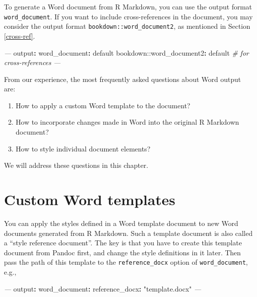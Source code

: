 \documentclass[
  11pt,
]{krantz}
\newenvironment{Shaded}{\begin{snugshade}}{\end{snugshade}}
\newcommand{\AttributeTok}[1]{\textcolor[rgb]{0.61,0.61,0.61}{#1}}
\newcommand{\CommentTok}[1]{\textcolor[rgb]{0.37,0.37,0.37}{\textit{#1}}}
\newcommand{\FunctionTok}[1]{\textcolor[rgb]{0,0,0}{#1}}
\newcommand{\KeywordTok}[1]{\textcolor[rgb]{0.27,0.27,0.27}{\textbf{#1}}}
\newcommand{\PreprocessorTok}[1]{\textcolor[rgb]{0.37,0.37,0.37}{\textit{#1}}}
\newcommand{\StringTok}[1]{\textcolor[rgb]{0.5,0.5,0.5}{#1}}
\begin{document}
To generate a Word document from R Markdown, you can use the output format \texttt{word\_document}. If you want to include cross-references in the document, you may consider the output format \texttt{bookdown::word\_document2}, as mentioned in Section \ref{cross-ref}.

\begin{Shaded}
\begin{Highlighting}[]
\PreprocessorTok{---}
\FunctionTok{output}\KeywordTok{:}
\AttributeTok{  }\FunctionTok{word_document}\KeywordTok{:}\AttributeTok{ default}
\AttributeTok{  bookdown:}\FunctionTok{:word_document2}\KeywordTok{:}\AttributeTok{ default}\CommentTok{  # for cross-references}
\PreprocessorTok{---}
\end{Highlighting}
\end{Shaded}

From our experience, the most frequently asked questions about Word output are:

\begin{enumerate}
\def\labelenumi{\arabic{enumi}.}
\item
  How to apply a custom Word template to the document?
\item
  How to incorporate changes made in Word into the original R Markdown document?
\item
  How to style individual document elements?
\end{enumerate}

We will address these questions in this chapter.

\hypertarget{word-template}{%
\section{Custom Word templates}\label{word-template}}

You can apply the styles defined in a Word template document to new Word documents generated from R Markdown. Such a template document is also called a ``style reference document''. The key is that you have to create this template document from Pandoc first, and change the style definitions in it later. Then pass the path of this template to the \texttt{reference\_docx} option of \texttt{word\_document}, e.g.,

\begin{Shaded}
\begin{Highlighting}[]
\PreprocessorTok{---}
\FunctionTok{output}\KeywordTok{:}
\AttributeTok{  }\FunctionTok{word_document}\KeywordTok{:}
\AttributeTok{    }\FunctionTok{reference_docx}\KeywordTok{:}\AttributeTok{ }\StringTok{"template.docx"}
\PreprocessorTok{---}
\end{Highlighting}
\end{Shaded}
\end{document}
